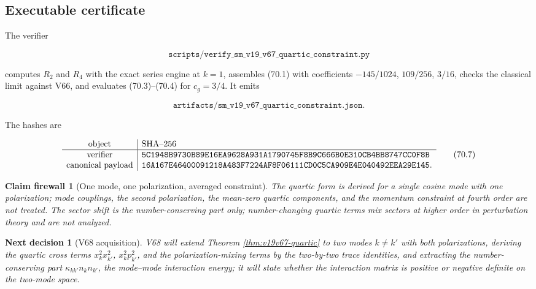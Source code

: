 \documentclass[11pt]{article}
\newtheorem{firewall}[theorem]{Claim firewall}
\newtheorem{decision}[theorem]{Next decision}
\theoremstyle{remark}
\begin{document}
\subsection{Executable certificate}

The verifier

\[
 \texttt{scripts/verify\_sm\_v19\_v67\_quartic\_constraint.py}       \tag{70.5}
\]

computes \(R_2\) and \(R_4\) with the exact series engine at \(k=1\),
assembles (70.1) with coefficients \(-145/1024\), \(109/256\), \(3/16\),
checks the classical limit against V66, and evaluates (70.3)--(70.4)
for \(c_g=3/4\).  It emits

\[
 \texttt{artifacts/sm\_v19\_v67\_quartic\_constraint.json}.          \tag{70.6}
\]

The hashes are

\[
\begin{array}{c|l}
\hbox{object}&\hbox{SHA--256}\\ \hline
\hbox{verifier}&
\texttt{5C1948B9730B89E16EA9628A931A1790745F8B9C666B0E310CB4BB8747CC0F8B}\\
\hbox{canonical payload}&
\texttt{16A167E46400091218A483F7224AF8F06111CD0C5CA909E4E040492EEA29E145}.
\end{array}                                                     \tag{70.7}
\]

\begin{firewall}[One mode, one polarization, averaged constraint]
\label{fire:v19v67}
The quartic form is derived for a single cosine mode with one
polarization; mode couplings, the second polarization, the mean-zero
quartic components, and the momentum constraint at fourth order are
not treated.  The sector shift is the number-conserving part only;
number-changing quartic terms mix sectors at higher order in
perturbation theory and are not analyzed.
\end{firewall}

\begin{decision}[V68 acquisition]
\label{dec:v19v67-next}
V68 will extend Theorem \ref{thm:v19v67-quartic} to two modes
\(k\neq k'\) with both polarizations, deriving the quartic cross terms
\(x_k^2x_{k'}^2\), \(x_k^2p_{k'}^2\), and the polarization-mixing
terms by the two-by-two trace identities, and extracting the
number-conserving part \(\kappa_{kk'}n_kn_{k'}\), the mode--mode
interaction energy; it will state whether the interaction matrix is
positive or negative definite on the two-mode space.
\end{decision}
\end{document}
